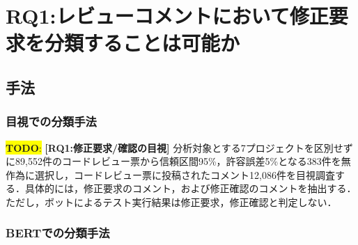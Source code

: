 \documentclass[11pt]{jreport}
\newcommand{\RQOne}{レビューコメントにおいて修正要求を分類することは可能か}
\newcommand{\todo}[1]{\colorbox{yellow}{{\bf TODO}:}{\color{red} {\textbf{[#1]}}}}
\begin{document}
\begin{table}[t]
\centering
  \caption{各プロジェクトにおいて導入されたコードレビュー票数とコメント数}
  \vspace{+1mm}
  \label{table:NumberOfProjects}
\end{table}


\chapter{RQ1:\RQOne}\label{sec:RQ1}

\section{手法}
\subsection{目視での分類手法}

\todo{RQ1:修正要求/確認の目視}
分析対象とする7プロジェクトを区別せずに89,552件のコードレビュー票から信頼区間95\%，許容誤差5\%となる383件を無作為に選択し，コードレビュー票に投稿されたコメント12,086件を目視調査する．具体的には，修正要求のコメント，および修正確認のコメントを抽出する．ただし，ボットによるテスト実行結果は修正要求，修正確認と判定しない．

\subsection{BERTでの分類手法}
\end{document}
